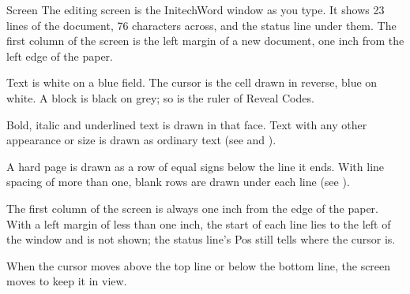 \begin{Feature}{Screen}
The editing screen is the InitechWord window as you type.  It shows 23
lines of the document, 76 characters across, and the status line under
them.  The first column of the screen is the left margin of a new document,
one inch from the left edge of the paper.

\Notes
{}
Text is white on a blue field.  The cursor is the cell drawn in reverse,
blue on white.  A block is black on grey; so is the ruler of Reveal Codes.

Bold, italic and underlined text is drawn in that face.  Text with any other
appearance or size is drawn as ordinary text (see  and
).

A hard page is drawn as a row of equal signs below the line it ends.  With
line spacing of more than one, blank rows are drawn under each line (see
).

The first column of the screen is always one inch from the edge of the
paper.  With a left margin of less than one inch, the start of each line
lies to the left of the window and is not shown; the status line's Pos still
tells where the cursor is.

When the cursor moves above the top line or below the bottom line, the
screen moves to keep it in view.

\end{Feature}

